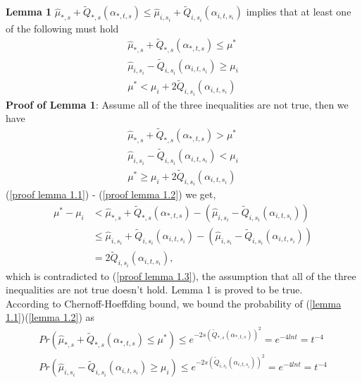 \documentclass{article}
\begin{document}
\begin{enumerate}
\begin{enumerate}
    \textbf{Lemma 1} $\hat{\mu}_{\ast, s} + \tilde{Q}_{\ast, s}(\alpha_{\ast, t, s})  \leq \hat{\mu}_{i, s_i} + \tilde{Q}_{i, s_i}(\alpha_{i,t, s_i})$ implies that at least one of the following must hold\\
    \begin{align}
        \label{lemma 1.1}
        \hat{\mu}_{\ast, s} + \tilde{Q}_{\ast, s}(\alpha_{\ast, t, s}) \leq \mu^\ast\\
        \label{lemma 1.2}
        \hat{\mu}_{i, s_i} -\tilde{Q}_{i, s_i}(\alpha_{i,t, s_i}) \geq \mu_i\\
        \label{lemma 1.3}
        \mu^\ast < \mu_i + 2 \tilde{Q}_{i, s_i}(\alpha_{i,t, s_i})
    \end{align}
    \textbf{Proof of Lemma 1}: Assume all of the three inequalities are not true, then we have
    \begin{align}
        \label{proof lemma 1.1}
        \hat{\mu}_{\ast, s} + \tilde{Q}_{\ast, s}(\alpha_{\ast, t, s}) > \mu^\ast\\
        \label{proof lemma 1.2}
        \hat{\mu}_{i, s_i} -\tilde{Q}_{i, s_i}(\alpha_{i,t, s_i}) < \mu_i\\
         \label{proof lemma 1.3}
        \mu^\ast \geq \mu_i + 2 \tilde{Q}_{i, s_i}(\alpha_{i,t, s_i})
    \end{align}
    (\ref{proof lemma 1.1}) - (\ref{proof lemma 1.2}) we get, 
    \begin{align}
        \mu^\ast - \mu_i &< \hat{\mu}_{\ast, s} + \tilde{Q}_{\ast, s}(\alpha_{\ast, t, s}) - (\hat{\mu}_{i, s_i} -\tilde{Q}_{i, s_i}(\alpha_{i,t, s_i})) \\
        & \leq \hat{\mu}_{i, s_i} + \tilde{Q}_{i, s_i}(\alpha_{i,t, s_i}) - (\hat{\mu}_{i, s_i} -\tilde{Q}_{i, s_i}(\alpha_{i,t, s_i}))\\
        &= 2 \tilde{Q}_{i, s_i}(\alpha_{i,t, s_i}),
    \end{align}
    which is contradicted to (\ref{proof lemma 1.3}), the assumption that all of the three inequalities are not true doesn't hold. Lemma 1 is proved to be true.\\
    
    According to Chernoff-Hoeffding bound, we bound the probability of (\ref{lemma 1.1})(\ref{lemma 1.2}) as
    \begin{align}
        Pr(\hat{\mu}_{\ast, s} + \tilde{Q}_{\ast, s}(\alpha_{\ast, t, s}) \leq \mu^\ast) \leq e^{-2s(\tilde{Q}_{\ast, s}(\alpha_{\ast, t, s}))^2} = e^{-4lnt} = t^{-4}\\
        Pr(\hat{\mu}_{i, s_i} -\tilde{Q}_{i, s_i}(\alpha_{i,t, s_i}) \geq \mu_i)  \leq e^{-2s(\tilde{Q}_{i, s_i}(\alpha_{i,t, s_i}))^2} = e^{-4lnt} = t^{-4}
    \end{align}
    

\end{enumerate}
\end{enumerate}
\end{document}
